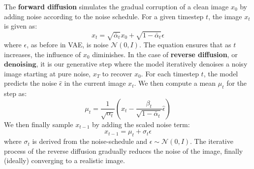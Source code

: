 \documentclass{article}
\begin{document}
The \textbf{forward diffusion} simulates the gradual corruption of a clean image $x_0$ by adding noise according to the noise schedule. For a given timestep $t$, the image $x_t$ is given as:
\begin{equation}
    x_t = \sqrt{\bar \alpha_t}x_0 + \sqrt{1-\bar \alpha_t} \epsilon
\end{equation}
where $\epsilon$, as before in VAE, is noise $\mathcal{N}(0,I)$.
\newline
The equation ensures that as $t$ increases, the influence of $x_0$ diminishes.
\newline
In the case of \textbf{reverse diffusion}, or $\textbf{denoising}$, it is our generative step where the model iteratively denoises a noisy image starting at pure noise, $x_T$ to recover $x_0$. \newline For each timestep $t$, the model predicts the noise $\hat \epsilon$ in the current image $x_t$. We then compute a mean $\mu_t$ for the step as:
\begin{equation}
    \mu_t = \frac{1}{\sqrt{\alpha_t}} \left(x_t - \frac{\beta_t}{\sqrt{1 - \bar \alpha_t}} \hat \epsilon \right)
\end{equation}
We then finally sample $x_{t-1}$ by adding the scaled noise term:
\begin{equation}
    x_{t-1} = \mu_t + \sigma_t \epsilon
\end{equation}
where $\sigma_t$ is derived from the noise-schedule and $\epsilon \sim \mathcal{N}(0,I)$.
\newline
The iterative process of the reverse diffusion gradually reduces the noise of the image, finally (ideally) converging to a realistic image.
\end{document}
